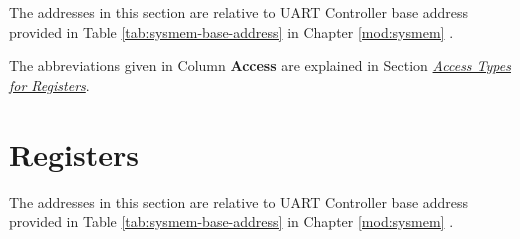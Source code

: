 \documentclass[main\_\_EN.tex]{subfiles}
\begin{document}
The addresses in this section are relative to UART Controller base address provided in Table \ref{tab:sysmem-base-address} in Chapter \ref{mod:sysmem} \textit{}.

The abbreviations given in Column \textbf{Access} are explained in Section \hyperref[glossary-access-types]{\textit{Access Types for Registers}}.







\clearpage
\section{Registers}

The addresses in this section are relative to UART Controller base address provided in Table \ref{tab:sysmem-base-address} in Chapter \ref{mod:sysmem} \textit{}.



\end{document}
